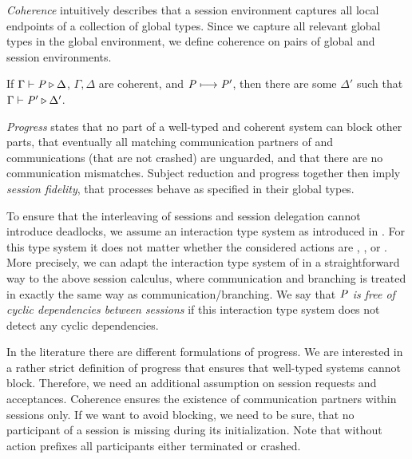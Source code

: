 
\emph{Coherence} intuitively describes that a session environment captures all local endpoints of a collection of global types.
Since we capture all relevant global types in the global environment, we define
coherence on pairs of global and session environments.

\begin{theorem}
	\label{thm:subjectReduction}
	If $ \Gamma \vdash \mathit{P} \triangleright \Delta $, $ \Gamma, \Delta $ are coherent, and $ \mathit{P} \longmapsto \mathit{P}' $, then there are some $ \Delta' $ such that $ \Gamma \vdash \mathit{P}' \triangleright \Delta' $.
\end{theorem}

\emph{Progress} states that no part of a well-typed and coherent system can block other parts, that eventually all matching communication partners of \strongR and \weakR communications (that are not crashed) are unguarded, and that there are no communication mismatches.
Subject reduction and progress together then imply \emph{session fidelity}, \ie that processes behave as specified in their global types.

To ensure that the interleaving of sessions and session delegation cannot introduce deadlocks, we assume an interaction type system as introduced in \cite{BettiniEtal08,hondaYoshidaCarbone16}.
For this type system it does not matter whether the considered actions are \strongR, \weakR, or \unrel.
More precisely, we can adapt the interaction type system of \cite{BettiniEtal08} in a straightforward way to the above session calculus, where \unrel communication and \weakR branching is treated in exactly the same way as \strongR communication/branching.
We say that \emph{$ \mathit{P} $ is free of cyclic dependencies between sessions} if this interaction type system does not detect any cyclic dependencies.

In the literature there are different formulations of progress.
We are interested in a rather strict definition of progress that ensures that well-typed systems cannot block.
Therefore, we need an additional assumption on session requests and acceptances.
Coherence ensures the existence of communication partners within sessions only.
If we want to avoid blocking, we need to be sure, that no participant of a session is missing during its initialization.
Note that without action prefixes all participants either terminated or crashed.

